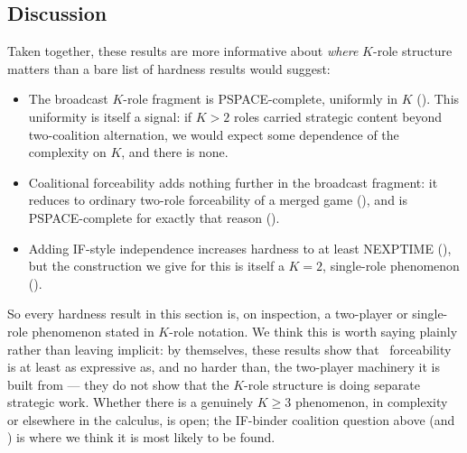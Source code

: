 \subsection{Discussion}

Taken together, these results are more informative about \emph{where} $K$-role
structure matters than a bare list of hardness results would suggest:

\begin{itemize}
  \item The broadcast $K$-role fragment is PSPACE-complete, uniformly in $K$
        (). This uniformity is itself a signal: if
        $K>2$ roles carried strategic content beyond two-coalition
        alternation, we would expect some dependence of the complexity on
        $K$, and there is none.
  \item Coalitional forceability adds nothing further in the broadcast
        fragment: it reduces to ordinary two-role forceability of a merged
        game (), and is PSPACE-complete
        for exactly that reason ().
  \item Adding IF-style independence increases hardness to at least NEXPTIME
        (), but the construction we give for this is
        itself a $K=2$, single-role phenomenon ().
\end{itemize}

So every hardness result in this section is, on inspection, a two-player or
single-role phenomenon stated in $K$-role notation. We think this is worth
saying plainly rather than leaving implicit: by themselves, these results show
that \KFOL\ forceability is at least as expressive as, and no harder than, the
two-player machinery it is built from --- they do not show that the $K$-role
structure is doing separate strategic work. Whether there is a genuinely
$K\ge 3$ phenomenon, in complexity or elsewhere in the calculus, is open; the
IF-binder coalition question above (and ) is where we
think it is most likely to be found.